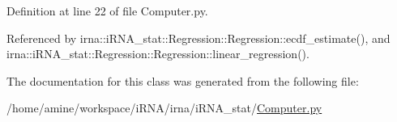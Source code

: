 \hypertarget{classirna_1_1iRNA__stat_1_1Computer_1_1Computer_a77d6f5c98a4f4b8c9d1f1157551fd037}{
\subsubsection[{unique\-\_\-s\-R\-N\-Aidinint}]{}}
\label{classirna_1_1iRNA__stat_1_1Computer_1_1Computer_a77d6f5c98a4f4b8c9d1f1157551fd037}


\-Definition at line 22 of file \-Computer.\-py.



\-Referenced by irna\-::i\-R\-N\-A\-\_\-stat\-::\-Regression\-::\-Regression\-::ecdf\-\_\-estimate(), and irna\-::i\-R\-N\-A\-\_\-stat\-::\-Regression\-::\-Regression\-::linear\-\_\-regression().



\-The documentation for this class was generated from the following file\-:\begin{DoxyCompactItemize}
\item 
/home/amine/workspace/i\-R\-N\-A/irna/i\-R\-N\-A\-\_\-stat/\hyperlink{Computer_8py}{\-Computer.\-py}\end{DoxyCompactItemize}
